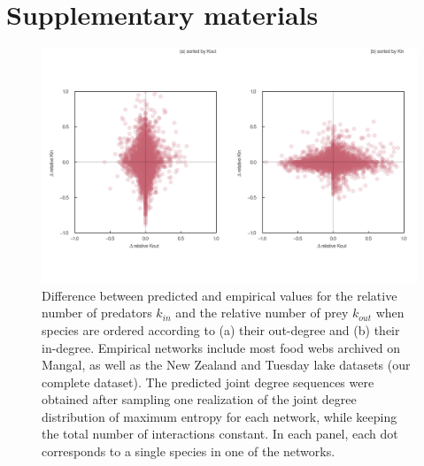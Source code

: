 \documentclass[
  12pt,
]{article}
\author{}
\date{}
\begin{document}
\hypertarget{supplementary-materials}{%
\section{Supplementary materials}\label{supplementary-materials}}

\begin{figure}
\hypertarget{fig:kin_kout_diff}{%
\centering
\includegraphics{figures/kin_kout_difference.png}
\caption{Difference between predicted and empirical values for the
relative number of predators \(k_{in}\) and the relative number of prey
\(k_{out}\) when species are ordered according to (a) their out-degree
and (b) their in-degree. Empirical networks include most food webs
archived on Mangal, as well as the New Zealand and Tuesday lake datasets
(our complete dataset). The predicted joint degree sequences were
obtained after sampling one realization of the joint degree distribution
of maximum entropy for each network, while keeping the total number of
interactions constant. In each panel, each dot corresponds to a single
species in one of the networks.}\label{fig:kin_kout_diff}
}
\end{figure}
\end{document}
